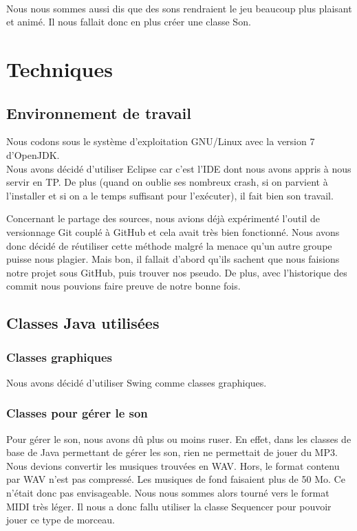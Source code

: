 \documentclass{article}
\begin{document}
\paragraph{}
Nous nous sommes aussi dis que des sons rendraient le jeu beaucoup plus plaisant et animé. Il nous fallait donc en plus créer une classe Son.


\section{Techniques}
  \subsection{Environnement de travail}
  Nous codons sous le système d'exploitation GNU/Linux avec la version 7 d'OpenJDK. \\
  Nous avons décidé d'utiliser Eclipse car c'est l'IDE dont nous avons appris à nous servir en TP. 
  De plus (quand on oublie ses nombreux crash, si on parvient à l'installer et si on a le temps suffisant pour l'exécuter), il fait bien son travail.
  
  Concernant le partage des sources, nous avions déjà expérimenté l'outil de versionnage Git couplé à GitHub et cela avait très bien fonctionné. 
  Nous avons donc décidé de réutiliser cette méthode malgré la menace qu'un autre groupe puisse nous plagier. Mais bon, il fallait d'abord qu'ils sachent que nous faisions notre projet sous GitHub, puis trouver nos pseudo. 
  De plus, avec l'historique des commit nous pouvions faire preuve de notre bonne fois.


\subsection{Classes Java utilisées}
  \subsubsection{Classes graphiques} Nous avons décidé d'utiliser Swing comme classes graphiques. %
  
  \subsubsection{Classes pour gérer le son} 
  Pour gérer le son, nous avons dû plus ou moins ruser. 
  En effet, dans les classes de base de Java permettant de gérer les son, rien ne permettait de jouer du MP3. 
  Nous devions convertir les musiques trouvées en WAV. Hors, le format contenu par WAV n'est pas compressé. 
  Les musiques de fond faisaient plus de 50 Mo. Ce n'était donc pas envisageable. 
  Nous nous sommes alors tourné vers le format MIDI très léger. 
  Il nous a donc fallu utiliser la classe Sequencer pour pouvoir jouer ce type de morceau.
  
\end{document}
